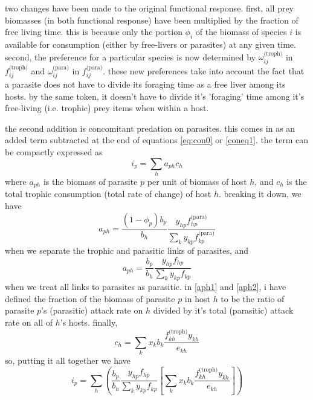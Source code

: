 \documentclass[11pt]{amsart}
\begin{document}
two changes have been made to the original functional response.  first, all prey biomasses (in both functional response) have been multiplied by the fraction of free living time.  this is because only the portion $\phi_i$ of the biomass of species $i$ is available for consumption (either by free-livers or parasites) at any given time.  second, the preference for a particular species is now determined by $\omega_{ij}^\text{(troph)}$ in $f_{ij}^\text{(troph)}$ and $\omega_{ij}^\text{(para)}$ in $f_{ij}^\text{(para)}$.  these new preferences take into account the fact that a parasite does not have to divide its foraging time as a free liver among its hosts.  by the same token, it doesn't have to divide it's 'foraging' time among it's free-living (i.e. trophic) prey items when within a host.

the second addition is concomitant predation on parasites.  this comes in as an added term subtracted at the end of equations \eqref{eq:con0} or \eqref{coneq1}.  the term can be compactly expressed as 
\begin{equation}
i_p = \sum_ha_{ph}c_h \label{ip1}
\end{equation}
where $a_{ph}$ is the biomass of parasite $p$ per unit of biomass of host $h$, and $c_h$ is the total trophic consumption (total rate of change) of host $h$.  breaking it down, we have
\begin{equation}
a_{ph} = \frac{(1-\phi_p)b_p}{b_h}\frac{y_{hp}f^\text{(para)}_{hp}}{\sum_{k}y_{kp}f^\text{(para)}_{kp}} \label{aph1}
\end{equation}
when we separate the trophic and parasitic links of parasites, and
\begin{equation}
a_{ph} = \frac{b_p}{b_h}\frac{y_{hp}f_{hp}}{\sum_{k}y_{kp}f_{kp}} \label{aph2}
\end{equation}
when we treat all links to parasites as parasitic.  in \eqref{aph1} and \eqref{aph2}, i have defined the fraction of the biomass of parasite $p$ in host $h$ to be the ratio of parasite $p$'s (parasitic) attack rate on $h$ divided by it's total (parasitic) attack rate on all of $h$'s hosts.  finally,
\begin{equation}
c_h = \sum_kx_kb_k\frac{f^\text{(troph)}_{kh}y_{kh}}{e_{kh}} \label{cpheq}
\end{equation}
so, putting it all together we have
\begin{equation}
i_p = \sum_h \left(\frac{b_p}{b_h}\frac{y_{hp}f_{hp}}{\sum_{k}y_{kp}f_{kp}}\left[\sum_kx_kb_k\frac{f^\text{(troph)}_{kh}y_{kh}}{e_{kh}}\right] \right) \label{ip2}
\end{equation}
\end{document}
